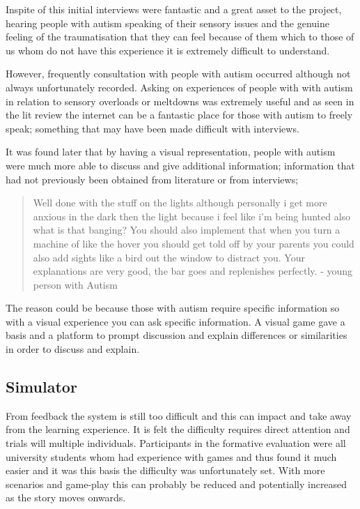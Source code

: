 \documentclass[11pt]{report}
\begin{document}
Inspite of this initial interviews were fantastic and a great asset to the project, hearing people with autism speaking of their sensory issues and the genuine feeling of the traumatisation that they can feel because of them which to those of us whom do not have this experience it is extremely difficult to understand. 

However, frequently consultation with people with autism occurred although not always unfortunately recorded. Asking on experiences of people with with autism in relation to sensory overloads or meltdowns was extremely useful and as seen in the lit review the internet can be a fantastic place for those with autism to freely speak; something that may have been made difficult with interviews.

It was found later that by having a visual representation, people with autism were much more able to discuss and give additional information; information that had not previously been obtained from literature or from interviews; 

\begin{quote}
Well done with the stuff on the lights although personally i get more anxious in the dark then the light because i feel like i'm being hunted also what is that banging? You should also implement that when you turn a machine of like the hover you should get told off by your parents you could also add sights like a bird out the window to distract you. Your explanations are very good, the bar goes and replenishes perfectly. - young person with Autism
\end{quote}

The reason could be because those with autism require specific information so with a visual experience you can ask specific information. A visual game gave a basis and a platform to prompt discussion and explain differences or similarities in order to discuss and explain. 


\subsection{Simulator}
From feedback the system is still too difficult and this can impact and take away from the learning experience. It is felt the difficulty requires direct attention and trials will multiple individuals. Participants in the formative evaluation were all university students whom had experience with games and thus found it much easier and it was this basis the difficulty was unfortunately set. With more scenarios and game-play this can probably be reduced and potentially increased as the story moves onwards.
 
\end{document}
